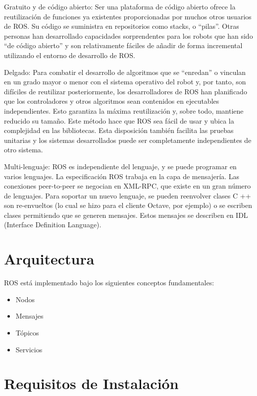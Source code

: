 Gratuito y de código abierto: Ser una plataforma de código abierto ofrece la reutilización de funciones ya existentes proporcionadas por muchos otros usuarios de ROS. Su código se suministra en repositorios como stacks, o ``pilas''. Otras personas han desarrollado capacidades sorprendentes para los robots que han sido ``de código abierto'' y son relativamente fáciles de añadir de forma incremental utilizando el entorno de desarrollo de ROS.

Delgado: Para combatir el desarrollo de algoritmos que se ``enredan'' o vinculan en un grado mayor o menor con el sistema operativo del robot y, por tanto, son difíciles de reutilizar posteriormente, los desarrolladores de ROS han planificado que los controladores y otros algoritmos sean contenidos en ejecutables independientes. Esto garantiza la máxima reutilización y, sobre todo, mantiene reducido su tamaño. Este método hace que ROS sea fácil de usar y ubica la complejidad en las bibliotecas. Esta disposición también facilita las pruebas unitarias y los sistemas desarrollados puede ser completamente independientes de otro sistema.

Multi-lenguaje: ROS es independiente del lenguaje, y se puede programar en varios lenguajes. La especificación ROS trabaja en la capa de mensajería. Las conexiones peer-to-peer se negocian en XML-RPC, que existe en un gran número de lenguajes. Para soportar un nuevo lenguaje, se pueden reenvolver clases C ++ son re-envueltos (lo cual se hizo para el cliente Octave, por ejemplo) o se escriben clases permitiendo que se generen mensajes. Estos mensajes se describen en IDL (Interface Definition Language). \cite{quigley2009ros}

\section{Arquitectura}

ROS está implementado bajo los siguientes conceptos fundamentales:

\begin{itemize}
	\itemsep1pt \parskip1pt 
	\item Nodos
	\item Mensajes
	\item Tópicos
	\item Servicios
\end{itemize} \cite{quigley2009ros}

\section{Requisitos de Instalación}

